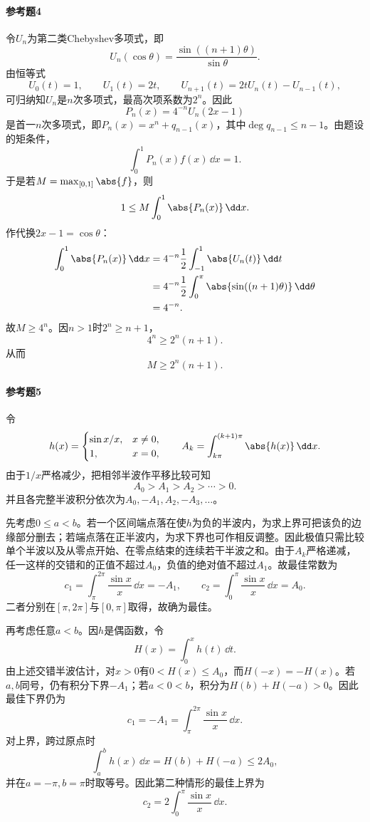 \paragraph{参考题4}
\begin{xsolution}
令$U_n$为第二类Chebyshev多项式，即
\[
 U_n(\cos\theta)=\frac{\sin((n+1)\theta)}{\sin\theta}.
\]
由恒等式
\[
 U_0(t)=1,\qquad U_1(t)=2t,\qquad
 U_{n+1}(t)=2tU_n(t)-U_{n-1}(t),
\]
可归纳知$U_n$是$n$次多项式，最高次项系数为$2^n$。因此
\[
 P_n(x)=4^{-n}U_n(2x-1)
\]
是首一$n$次多项式，即$P_n(x)=x^n+q_{n-1}(x)$，其中$\deg q_{n-1}\le n-1$。由题设的矩条件，
\[
 \int_0^1P_n(x)f(x)\,\dd x=1.
\]
于是若$M=\max_{[0,1]}\abs{f}$，则
\[
 1\le M\int_0^1\abs{P_n(x)}\,\dd x.
\]
作代换$2x-1=\cos\theta$：
\begin{align*}
\int_0^1\abs{P_n(x)}\,\dd x
&=4^{-n}\frac12\int_{-1}^1\abs{U_n(t)}\,\dd t\\
&=4^{-n}\frac12\int_0^\pi\abs{\sin((n+1)\theta)}\,\dd\theta\\
&=4^{-n}.
\end{align*}
故$M\ge4^n$。因$n>1$时$2^n\ge n+1$，
\[
 4^n\ge2^n(n+1).
\]
从而
\[
 \boxed{M\ge2^n(n+1)}.
\]
\end{xsolution}

\paragraph{参考题5}
\begin{xsolution}
令
\[
 h(x)=\begin{cases}\sin x/x,&x\ne0,\\1,&x=0,\end{cases}
\qquad
 A_k=\int_{k\pi}^{(k+1)\pi}\abs{h(x)}\,\dd x.
\]
由于$1/x$严格减少，把相邻半波作平移比较可知
\[
 A_0>A_1>A_2>\cdots>0.
\]
并且各完整半波积分依次为$A_0,-A_1,A_2,-A_3,\ldots$。

先考虑$0\le a<b$。若一个区间端点落在使$h$为负的半波内，为求上界可把该负的边缘部分删去；若端点落在正半波内，为求下界也可作相反调整。因此极值只需比较单个半波以及从零点开始、在零点结束的连续若干半波之和。由于$A_k$严格递减，任一这样的交错和的正值不超过$A_0$，负值的绝对值不超过$A_1$。故最佳常数为
\[
 \boxed{c_1=\int_\pi^{2\pi}\frac{\sin x}{x}\,\dd x=-A_1},
 \qquad
 \boxed{c_2=\int_0^\pi\frac{\sin x}{x}\,\dd x=A_0}.
\]
二者分别在$[\pi,2\pi]$与$[0,\pi]$取得，故确为最佳。

再考虑任意$a<b$。因$h$是偶函数，令
\[
 H(x)=\int_0^xh(t)\,\dd t.
\]
由上述交错半波估计，对$x>0$有$0<H(x)\le A_0$，而$H(-x)=-H(x)$。若$a,b$同号，仍有积分下界$-A_1$；若$a<0<b$，积分为$H(b)+H(-a)>0$。因此最佳下界仍为
\[
 \boxed{c_1=-A_1=\int_\pi^{2\pi}\frac{\sin x}{x}\,\dd x}.
\]
对上界，跨过原点时
\[
 \int_a^bh(x)\,\dd x=H(b)+H(-a)\le2A_0,
\]
并在$a=-\pi,b=\pi$时取等号。因此第二种情形的最佳上界为
\[
 \boxed{c_2=2\int_0^\pi\frac{\sin x}{x}\,\dd x}.
\]
\end{xsolution}

